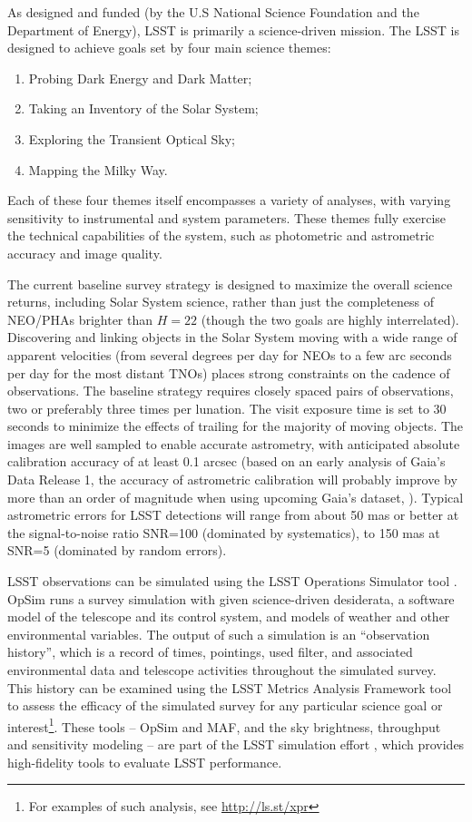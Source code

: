 As designed and funded (by the U.S National Science Foundation and
the Department of Energy), LSST is primarily a science-driven mission.
The LSST is designed to achieve goals set by four main science themes:
\begin{enumerate}
\item Probing Dark Energy and Dark Matter;
\item Taking an Inventory of the Solar System;
\item Exploring the Transient Optical Sky;
\item Mapping the Milky Way.
\end{enumerate}
Each of these four themes itself encompasses a variety of analyses, with
varying sensitivity to instrumental and system parameters. These themes
fully exercise the technical capabilities of the system, such as photometric
and astrometric accuracy and image quality.

The current baseline survey strategy is designed to maximize the overall science returns, including
Solar System science, rather than just the completeness of NEO/PHAs brighter than $H=22$ (though the
two goals are highly interrelated). Discovering and linking objects in the Solar System
moving with a wide range of apparent velocities (from several degrees per day for
NEOs to a few arc seconds per day for the most distant TNOs) places strong
constraints on the cadence of observations. The baseline strategy requires closely
spaced pairs of observations, two or preferably three times per lunation. The visit
exposure time is set to 30 seconds to minimize the effects of trailing for the majority of
moving objects. The images are well sampled to enable accurate astrometry, with
anticipated absolute calibration accuracy of at least 0.1 arcsec (based on an early analysis 
of Gaia's Data Release 1, the accuracy of astrometric calibration will probably improve 
by more than an order of magnitude when using upcoming Gaia's dataset, \citealt{Gaia}).
Typical astrometric errors for LSST detections will range from about 50 mas or better
at the signal-to-noise ratio SNR=100 (dominated by systematics), to 150 mas at SNR=5
(dominated by random errors). 

LSST observations can be simulated using the LSST Operations Simulator tool
\citep[OpSim,][]{delgado14}. OpSim runs a survey simulation with given
science-driven desiderata,  a software model of the telescope and its control
system, and models of weather and other  environmental variables. The output of
such a simulation is an ``observation history'', which  is a record of times,
pointings, used filter, and associated environmental data and telescope
activities throughout the simulated survey.  This history can be examined using
the LSST  Metrics Analysis Framework tool \citep[MAF,][]{jones14} to assess the
efficacy of the simulated survey for any particular science goal or
interest\footnote{For examples of such analysis, see \url{http://ls.st/xpr}}. These
tools -- OpSim and MAF, and the sky brightness, throughput and sensitivity modeling --
are part of the LSST simulation effort \citep{LSSTSimsOverview}, which provides high-fidelity
tools to evaluate LSST performance.


